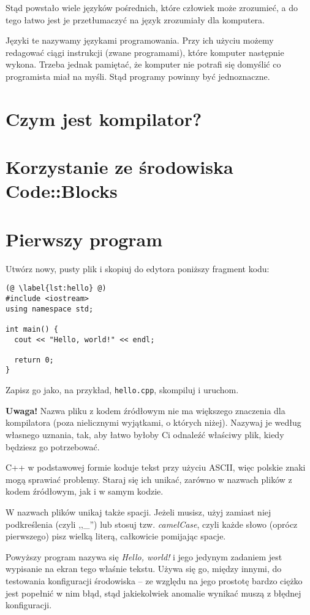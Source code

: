 \documentclass[11pt]{book}
\newenvironment{notice}
{ \vspace{1em} \noindent
  \definecolor{shadecolor}{gray}{0.9}
  \begin{minipage}{\textwidth} 
  \begin{shaded} \textbf{Uwaga!} }
{ \end{shaded} 
  \end{minipage} 
  \vspace{1em} }
\begin{document}
Stąd powstało wiele języków pośrednich, które człowiek może zrozumieć, a do
tego łatwo jest je przetłumaczyć na język zrozumiały dla komputera.

Języki te nazywamy językami programowania. Przy ich użyciu możemy redagować
ciągi instrukcji (zwane programami), które komputer następnie wykona. Trzeba 
jednak pamiętać, że komputer nie potrafi się domyślić co programista miał na 
myśli. Stąd programy powinny być jednoznaczne.

\section{Czym jest kompilator?}
\section{Korzystanie ze środowiska Code::Blocks}
\section{Pierwszy program}
Utwórz nowy, pusty plik i skopiuj do edytora poniższy fragment kodu:

\begin{lstlisting}[caption={Hello, world!}]
(@ \label{lst:hello} @)
#include <iostream>
using namespace std;

int main() {
  cout << "Hello, world!" << endl;

  return 0;
}
\end{lstlisting}

Zapisz go jako, na przykład, \texttt{hello.cpp}, skompiluj i uruchom.

\begin{notice}
Nazwa pliku z kodem źródłowym nie ma większego znaczenia dla kompilatora
(poza nielicznymi wyjątkami, o których niżej). Nazywaj je według własnego
uznania, tak, aby łatwo byłoby Ci odnaleźć właściwy plik, kiedy będziesz go
potrzebować.

C++ w podstawowej formie koduje tekst przy użyciu ASCII, więc polskie znaki
mogą sprawiać problemy. Staraj się ich unikać, zarówno w nazwach plików z kodem 
źródłowym, jak i w samym kodzie.

W nazwach plików unikaj także spacji. Jeżeli musisz, użyj zamiast niej
podkreślenia (czyli ,,\_'') lub stosuj tzw. \textit{camelCase}, czyli
każde słowo (oprócz pierwszego) pisz wielką literą, całkowicie pomijając spacje.
\end{notice}

Powyższy program nazywa się \textit{Hello, world!} i jego jedynym zadaniem
jest wypisanie na ekran tego właśnie tekstu. Używa się go, między innymi,
do testowania konfiguracji środowiska -- ze względu na jego prostotę bardzo
ciężko jest popełnić w nim błąd, stąd jakiekolwiek anomalie wynikać muszą
z błędnej konfiguracji.
\end{document}
